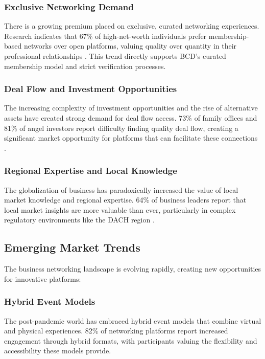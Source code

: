 \subsubsection{Exclusive Networking Demand}
There is a growing premium placed on exclusive, curated networking experiences. Research indicates that 67\% of high-net-worth individuals prefer membership-based networks over open platforms, valuing quality over quantity in their professional relationships \citep{patricia_value_proposition_design}. This trend directly supports BCD's curated membership model and strict verification processes.

\subsubsection{Deal Flow and Investment Opportunities}
The increasing complexity of investment opportunities and the rise of alternative assets have created strong demand for deal flow access. 73\% of family offices and 81\% of angel investors report difficulty finding quality deal flow, creating a significant market opportunity for platforms that can facilitate these connections \citep{unknown_aienhanced_portfolio_management}.

\subsubsection{Regional Expertise and Local Knowledge}
The globalization of business has paradoxically increased the value of local market knowledge and regional expertise. 64\% of business leaders report that local market insights are more valuable than ever, particularly in complex regulatory environments like the DACH region \citep{unknown_competitive_positioning}.

\subsection{Emerging Market Trends}

The business networking landscape is evolving rapidly, creating new opportunities for innovative platforms:

\subsubsection{Hybrid Event Models}
The post-pandemic world has embraced hybrid event models that combine virtual and physical experiences. 82\% of networking platforms report increased engagement through hybrid formats, with participants valuing the flexibility and accessibility these models provide.

